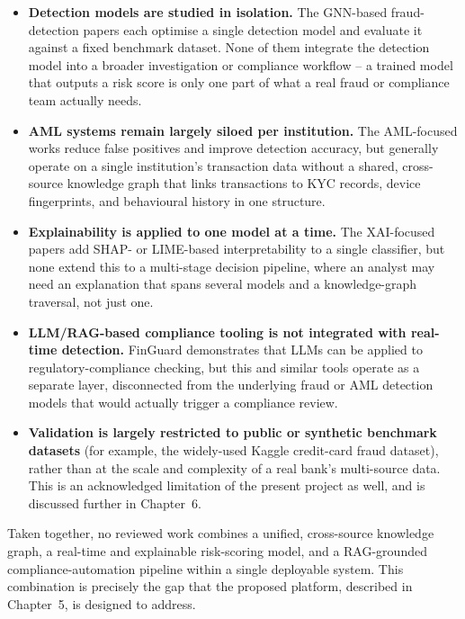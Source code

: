\begin{itemize}
    \item \textbf{Detection models are studied in isolation.} The GNN-based fraud-detection papers \cite{gnn_review2024, catgnn2024, hgnn2025, gnn_enhance2025, tmrggnn2026} each optimise a single detection model and evaluate it against a fixed benchmark dataset. None of them integrate the detection model into a broader investigation or compliance workflow -- a trained model that outputs a risk score is only one part of what a real fraud or compliance team actually needs.
    \item \textbf{AML systems remain largely siloed per institution.} The AML-focused works \cite{aml_ml2024, aml_review2024, aml_compare2025, aml_leverage2026, dpxfin2026} reduce false positives and improve detection accuracy, but generally operate on a single institution's transaction data without a shared, cross-source knowledge graph that links transactions to KYC records, device fingerprints, and behavioural history in one structure.
    \item \textbf{Explainability is applied to one model at a time.} The XAI-focused papers \cite{xai_fed2025, xai_stack2025, xai_user2024} add SHAP- or LIME-based interpretability to a single classifier, but none extend this to a multi-stage decision pipeline, where an analyst may need an explanation that spans several models and a knowledge-graph traversal, not just one.
    \item \textbf{LLM/RAG-based compliance tooling is not integrated with real-time detection.} FinGuard \cite{finguard2026} demonstrates that LLMs can be applied to regulatory-compliance checking, but this and similar tools operate as a separate layer, disconnected from the underlying fraud or AML detection models that would actually trigger a compliance review.
    \item \textbf{Validation is largely restricted to public or synthetic benchmark datasets} (for example, the widely-used Kaggle credit-card fraud dataset), rather than at the scale and complexity of a real bank's multi-source data. This is an acknowledged limitation of the present project as well, and is discussed further in Chapter~6.
\end{itemize}

Taken together, no reviewed work combines a unified, cross-source knowledge graph, a real-time and explainable risk-scoring model, and a RAG-grounded compliance-automation pipeline within a single deployable system. This combination is precisely the gap that the proposed platform, described in Chapter~5, is designed to address.
